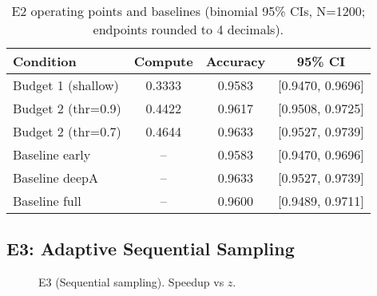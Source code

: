 \begin{table}[H]
  \centering
  \caption{E2 operating points and baselines (binomial 95\% CIs, N=1200; endpoints rounded to 4 decimals).}
  \vspace{0.25em}
  \begin{adjustbox}{width=\linewidth}
  \begin{tabular}{l c c c}
    \toprule
    Condition & Compute & Accuracy & 95\% CI \\
    \midrule
    Budget 1 (shallow) & 0.3333 & 0.9583 & [0.9470, 0.9696] \\
    Budget 2 (thr=0.9) & 0.4422 & 0.9617 & [0.9508, 0.9725] \\
    Budget 2 (thr=0.7) & 0.4644 & 0.9633 & [0.9527, 0.9739] \\
    \midrule
    Baseline early & -- & 0.9583 & [0.9470, 0.9696] \\
    Baseline deepA & -- & 0.9633 & [0.9527, 0.9739] \\
    Baseline full  & -- & 0.9600 & [0.9489, 0.9711] \\
    \bottomrule
  \end{tabular}
  \end{adjustbox}
\end{table}

\subsection{E3: Adaptive Sequential Sampling}
\begin{figure}[H]
  \centering
  \begin{adjustbox}{width=\linewidth}
  \end{adjustbox}
  \caption{E3 (Sequential sampling). Speedup vs $z$.}
  \label{fig:e3}
\end{figure}

